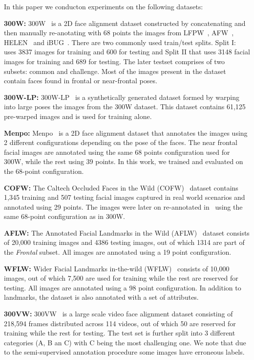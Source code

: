 \documentclass{bmvc2k}
\begin{document}
In this paper we conducton experiments on the following datasets:

\noindent\textbf{300W:} 300W~\cite{sagonas2013300} is a 2D face alignment dataset constructed by concatenating and then manually re-anotating with 68 points the images from LFPW~\cite{belhumeur2013localizing}, AFW~\cite{zhu2012face}, HELEN~\cite{le2012interactive} and iBUG~\cite{sagonas2013semi}. There are two commonly used train/test splits. Split I: uses 3837 images for training and 600 for testing and Split II that uses 3148 facial images for training and 689 for testing. The later testset comprises of two subsets: common and challenge.  Most of the images present in the dataset contain faces found in frontal or near-frontal poses.

\noindent\textbf{300W-LP:} 300W-LP~\cite{zhu2016face} is a synthetically generated dataset formed by warping into large poses the images from the 300W dataset. This dataset contains 61,125 pre-warped images and is used for training alone.

\noindent\textbf{Menpo:} Menpo~\cite{zafeiriou2017menpo} is a 2D face alignment dataset that annotates the images using 2 different configurations depending on the pose of the faces. The near frontal facial images are annotated using the same 68 points configuration used for 300W, while the rest using 39 points. In this work, we trained and evaluated on the 68-point configuration.

\noindent\textbf{COFW:} The Caltech Occluded Faces in the Wild (COFW)~\cite{burgos2013robust} dataset contains 1,345 training and 507 testing facial images captured in real world scenarios and annotated using 29 points. The images were later on re-annotated in~\cite{ghiasi2015occlusion} using the same 68-point configuration as in 300W.

\noindent\textbf{AFLW:} The Annotated Facial Landmarks in the Wild (AFLW)~\cite{kostinger2011annotated} dataset consists of 20,000 training images and 4386 testing images, out of which 1314 are part of the \textit{Frontal} subset. All images are annotated using a 19 point configuration.

\noindent\textbf{WFLW:} Wider Facial Landmarks in-the-wild (WFLW)~\cite{wayne2018lab} consists of 10,000 images, out of which 7,500 are used for training while the rest are reserved for testing. All images are annotated using a 98 point configuration. In addition to landmarks, the dataset is also annotated with a set of attributes.

\noindent\textbf{300VW:} 300VW~\cite{shen2015first} is a large scale video face alignment dataset consisting of 218,594 frames distributed across 114 videos, out of which 50 are reserved for training while the rest for testing. The test set is further split into 3 different categories (A, B an C) with C  being the most challenging one. We note that due to the semi-supervised annotation procedure some images have erroneous labels.
\end{document}
